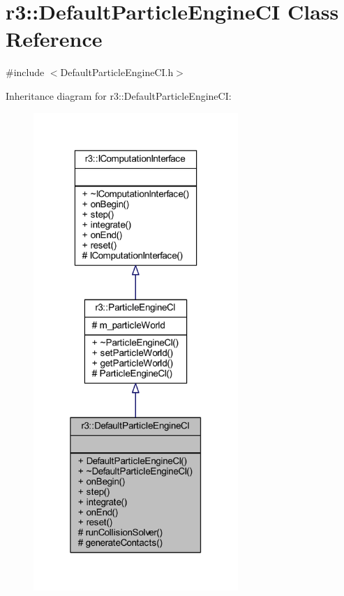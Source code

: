 \hypertarget{classr3_1_1_default_particle_engine_c_i}{}\section{r3\+:\+:Default\+Particle\+Engine\+CI Class Reference}
\label{classr3_1_1_default_particle_engine_c_i}


{\ttfamily \#include $<$Default\+Particle\+Engine\+C\+I.\+h$>$}



Inheritance diagram for r3\+:\+:Default\+Particle\+Engine\+CI\+:\nopagebreak
\begin{figure}[H]
\begin{center}
\leavevmode
\includegraphics[width=220pt]{classr3_1_1_default_particle_engine_c_i__inherit__graph}
\end{center}
\end{figure}


